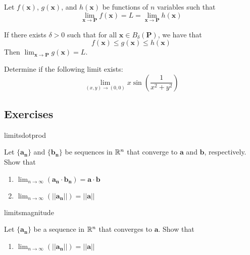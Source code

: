     
    
    
    
    
    \begin{theorem}
    Let $f(\bm{x})$, $g(\bm{x})$, and $h(\bm{x})$ be functions of $n$ variables such that $$\lim_{\bm{x} \to \bm{P}}f(\bm{x}) = L = \lim_{\bm{x} \to \bm{P}}h(\bm{x})$$
    
    If there exists $\delta > 0$ such that for all $\bm{x} \in B_\delta(\bm{P})$, we have that $$f(\bm{x}) \leq g(\bm{x}) \leq h(\bm{x})$$ 
    Then $\lim_{\bm{x} \to \bm{P}}g(\bm{x}) = L$.
    \end{theorem}
    
    \begin{example}
    Determine if the following limit exists: $$\lim_{(x,y) \to (0,0)} x\sin(\frac{1}{x^2 + y^2})$$ 
    \end{example}
    
    
    
    
    
    
    
    
    
    
    
    
    
    
    
    
    
    
    
    
    

\subsection{Exercises}

\begin{problem}{limitsdotprod}

Let $\{\bm{a_n}\}$ and $\{\bm{b_n}\}$ be sequences in $\mathbb{R}^n$ that converge to $\bm{a}$ and $\bm{b}$, respectively.  Show that
      \begin{enumerate}
          \item $\lim_{n \to \infty}( \bm{a_n} \cdot \bm{b_n} ) = \bm{a} \cdot \bm{b}$
          \item $\lim_{n \to \infty}(||\bm{a_n}||) = || \bm{a}||$
      \end{enumerate}
\end{problem}

\begin{problem}{limitsmagnitude}

Let $\{\bm{a_n}\}$ be a sequence in $\mathbb{R}^n$ that converges to $\bm{a}$.  Show that
      \begin{enumerate}
          \item $\lim_{n \to \infty}(||\bm{a_n}||) = || \bm{a}||$
      \end{enumerate}

\end{problem}


